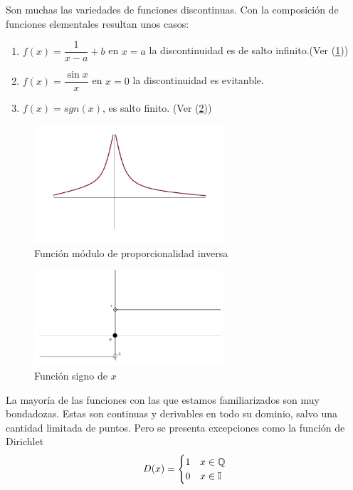 \documentclass[10pt,twoside]{SelfArx} %
\begin{document}
Son muchas las variedades de funciones discontinuas. Con la composici\'on de funciones elementales resultan unos casos:
\begin{enumerate}
	\item $ f(x)=\dfrac{1}{x-a} +b $ en $ x=a $ la discontinuidad es de salto infinito.(Ver (\ref{modulo1sobrex}))
	\item $ f(x)=\dfrac{\sin x}{x} $ en $ x=0 $ la discontinuidad es evitanble.
	\item $ f(x)=sgn(x) $, es salto finito. (Ver (\ref{funcion_signo_x}))
\end{enumerate}
\begin{figure}[h]
	\centering
	\includegraphics[width=7cm]{modulo1sobrex}
	\caption{Funci\'on  módulo de proporcionalidad inversa}
	\label{modulo1sobrex}
\end{figure}
\begin{figure}[h]
	\centering
	\includegraphics[width=7cm]{funcion_signo_x}
	\caption{Función signo de $ x $}
	\label{funcion_signo_x}
\end{figure}
La mayoría de las funciones con las que estamos familiarizados son muy bondadozas. Estas son continuas y derivables en todo su dominio, salvo una cantidad limitada de puntos. Pero se presenta excepciones como la función de Dirichlet
\[ D(x)=\begin{cases}
1 & \mbox{$ x\in\mathbb{Q} $}\\
0 & \mbox{$ x\in\mathbb{I} $}
\end{cases} \]
\end{document}
